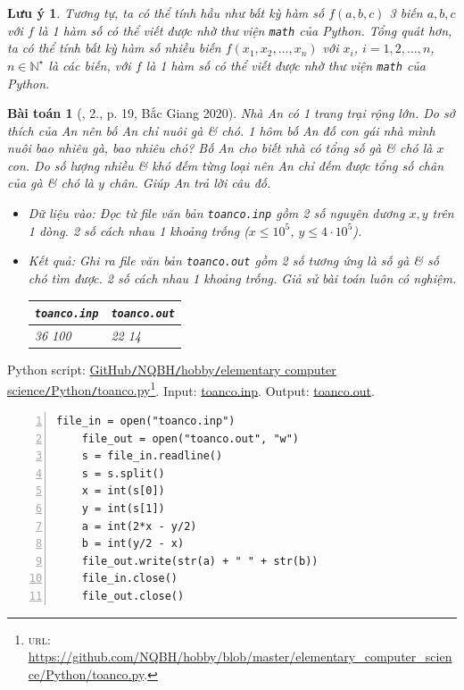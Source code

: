 \documentclass{article}
\newtheorem{baitoan}{Bài toán}
\newtheorem{luuy}{Lưu ý}
\begin{document}
\begin{luuy}
	Tương tự, ta có thể tính hầu như bất kỳ hàm số $f(a,b,c)$ 3 biến $a,b,c$ với $f$ là 1 hàm số có thể viết được nhờ thư viện \texttt{math} của Python. Tổng quát hơn, ta có thể tính bất kỳ hàm số nhiều biến $f(x_1,x_2,\ldots,x_n)$ với $x_i$, $i = 1,2,\ldots,n$, $n\in\mathbb{N}^\star$ là các biến, với $f$ là 1 hàm số có thể viết được nhờ thư viện \texttt{math} của Python.
\end{luuy}

\begin{baitoan}[\cite{VietSTEM2021}, 2., p. 19, Bắc Giang 2020]
	Nhà An có 1 trang trại rộng lớn. Do sở thích của An nên bố An chỉ nuôi gà \& chó. 1 hôm bố An đố con gái nhà mình nuôi bao nhiêu gà, bao nhiêu chó? Bố An cho biết nhà có tổng số gà \& chó là $x$ con. Do số lượng nhiều \& khó đếm từng loại nên An chỉ đếm được tổng số chân của gà \& chó là $y$ chân. Giúp An trả lời câu đố.
	\begin{itemize}
		\item {\sf Dữ liệu vào:} Đọc từ file văn bản \verb|toanco.inp| gồm 2 số nguyên dương $x,y$ trên 1 dòng. 2 số cách nhau 1 khoảng trống ($x\le10^5$, $y\le4\cdot10^5$).
		\item {\sf Kết quả:} Ghi ra file văn bản \verb|toanco.out| gồm 2 số tương ứng là số gà \& số chó tìm được. 2 số cách nhau 1 khoảng trống. Giả sử bài toán luôn có nghiệm.
		\begin{table}[H]
			\centering
			\begin{tabular}{|l|l|}
				\hline
				\texttt{toanco.inp} & \texttt{toanco.out} \\
				\hline
				36 100 & 22 14 \\
				\hline
			\end{tabular}
		\end{table}
	\end{itemize}
\end{baitoan}
Python script: \href{https://github.com/NQBH/hobby/blob/master/elementary_computer_science/Python/toanco.py}{GitHub\texttt{/}NQBH\texttt{/}hobby\texttt{/}elementary computer science\texttt{/}Python\texttt{/}toanco.py}\footnote{\textsc{url}: \url{https://github.com/NQBH/hobby/blob/master/elementary_computer_science/Python/toanco.py}.}. Input: \href{https://github.com/NQBH/hobby/blob/master/elementary_computer_science/Python/toanco.inp}{toanco.inp}. Output: \href{https://github.com/NQBH/hobby/blob/master/elementary_computer_science/Python/toanco.out}{toanco.out}.
\begin{Verbatim}[numbers=left,xleftmargin=5mm]
	file_in = open("toanco.inp")
	file_out = open("toanco.out", "w")
	s = file_in.readline()
	s = s.split()
	x = int(s[0])
	y = int(s[1])
	a = int(2*x - y/2)
	b = int(y/2 - x)
	file_out.write(str(a) + " " + str(b))
	file_in.close()
	file_out.close()
\end{Verbatim}
\end{document}
